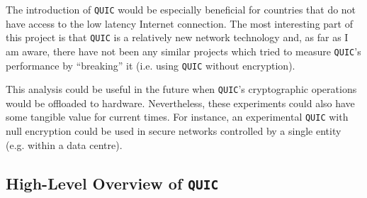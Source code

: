 \documentclass[12pt,a4paper,twoside,openright]{report}
\begin{document}
The introduction of \texttt{QUIC} would be especially beneficial for countries that do not have access to the low latency Internet connection.
The most interesting part of this project is that  \texttt{QUIC} is a relatively new network technology and, as far as I am aware, there have not been any similar projects which tried to measure \texttt{QUIC}’s performance by \enquote{breaking} it (i.e. using \texttt{QUIC} without encryption).

This analysis could be useful in the future when \texttt{QUIC}’s cryptographic operations would be offloaded to hardware. Nevertheless, these experiments could also have some tangible value for current times. 
For instance, an experimental \texttt{QUIC} with null encryption could be used in secure networks controlled by a single entity (e.g. within a data centre).





 
 
 
 




\subsection{High-Level Overview of \texttt{QUIC}}
\end{document}
